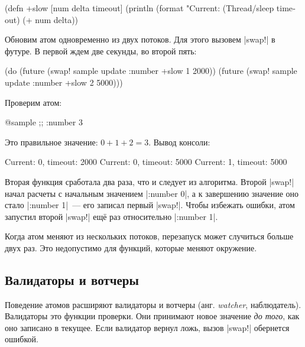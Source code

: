 \begin{english}
  \begin{clojure}
(defn +slow
  [num delta timeout]
  (println (format "Current: %
  (Thread/sleep timeout)
  (+ num delta))
  \end{clojure}
\end{english}

Обновим атом одновременно из двух потоков. Для этого вызовем \spverb|swap!| в
футуре. В первой ждем две секунды, во второй пять:

\begin{english}
  \begin{clojure}
(do (future (swap! sample update :number +slow 1 2000))
    (future (swap! sample update :number +slow 2 5000)))
  \end{clojure}
\end{english}

\noindent
Проверим атом:

\begin{english}
  \begin{clojure}
@sample ;; {:number 3}
  \end{clojure}
\end{english}

\noindent
Это правильное значение: $0 + 1 + 2 = 3$. Вывод консоли:

\begin{english}
  \begin{text}
Current: 0, timeout: 2000
Current: 0, timeout: 5000
Current: 1, timeout: 5000
  \end{text}
\end{english}

Вторая функция сработала два раза, что и следует из алгоритма. Второй
\spverb|swap!| начал расчеты с начальным значением \spverb|{:number 0}|, а к
завершению значение оно стало \spverb|{:number 1}|~--- его записал первый
\spverb|swap!|. Чтобы избежать ошибки, атом запустил второй \spverb|swap!| ещ\"{е}
раз относительно \spverb|{:number 1}|.

Когда атом меняют из нескольких потоков, перезапуск может случиться больше двух
раз. Это недопустимо для функций, которые меняют окружение.

\subsection{Валидаторы и вотчеры}

Поведение атомов расширяют валидаторы и вотчеры (анг. \emph{watcher},
наблюдатель). Валидаторы это функции проверки. Они принимают новое значение
\emph{до того}, как оно записано в текущее. Если валидатор вернул ложь, вызов
\spverb|swap!| обернется ошибкой.

